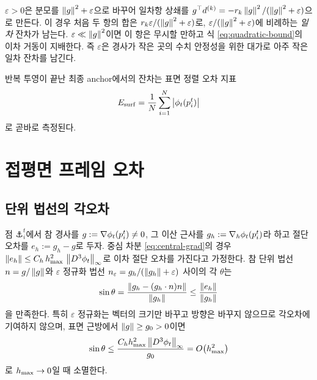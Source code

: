 \begin{remark}
$\varepsilon>0$은 분모를 $\left\lVert g \right\rVert^2+\varepsilon$으로 바꾸어 일차항 상쇄를
$g^{\top} d^{(k)} = -r_k\left\lVert g \right\rVert^2/(\left\lVert g \right\rVert^2+\varepsilon)$으로 만든다. 이 경우 처음
두 항의 합은 $r_k\varepsilon/(\left\lVert g \right\rVert^2+\varepsilon)$로,
$\varepsilon/(\left\lVert g \right\rVert^2+\varepsilon)$에 비례하는 \emph{일차} 잔차가 남는다.
$\varepsilon \ll \left\lVert g \right\rVert^2$이면 이 항은 무시할 만하고 식
\eqref{eq:quadratic-bound}의 이차 거동이 지배한다. 즉 $\varepsilon$은 경사가 작은 곳의
수치 안정성을 위한 대가로 아주 작은 일차 잔차를 남긴다.
\end{remark}

반복 투영이 끝난 최종 anchor에서의 잔차는 표면 정렬 오차 지표
\begin{equation}
  E_{\mathrm{surf}} = \frac{1}{N}\sum_{i=1}^{N}\left\lvert \phi_t(p^t_i) \right\rvert
  \label{eq:e-surf}
\end{equation}
로 곧바로 측정된다.

\section{접평면 프레임 오차}
\label{sec:frame-error}

\subsection{단위 법선의 각오차}

\begin{proposition}
\label{prop:normal-error}
점 $\anchor^t_i$에서 참 경사를 $g := \nabla\phi_t(p^t_i)\ne0$, 그 이산 근사를
$g_h := \nabla_h\phi_t(p^t_i)$라 하고 절단 오차를 $e_h := g_h - g$로 두자. 중심
차분 \eqref{eq:central-grad}의 경우
$\left\lVert e_h \right\rVert \le C_h\,h_{\max}^2\,\left\lVert D^3\phi_t \right\rVert_\infty$로 이차 절단 오차를 가진다고
가정한다. 참 단위 법선 $n = g/\left\lVert g \right\rVert$와 $\varepsilon$ 정규화 법선
$n_\varepsilon = g_h/(\left\lVert g_h \right\rVert+\varepsilon)$ 사이의 각 $\theta$는
\begin{equation}
  \sin\theta = \frac{\left\lVert g_h - (g_h\cdot n)n \right\rVert}{\left\lVert g_h \right\rVert}
  \le \frac{\left\lVert e_h \right\rVert}{\left\lVert g_h \right\rVert}
  \label{eq:sin-theta}
\end{equation}
을 만족한다. 특히 $\varepsilon$ 정규화는 벡터의 크기만 바꾸고 방향은 바꾸지 않으므로
각오차에 기여하지 않으며, 표면 근방에서 $\left\lVert g \right\rVert\ge g_0>0$이면
\begin{equation}
  \sin\theta \le \frac{C_h h_{\max}^2 \left\lVert D^3\phi_t \right\rVert_\infty}{g_0} = O\bigl(h_{\max}^2\bigr)
  \label{eq:normal-rate}
\end{equation}
로 $h_{\max}\to0$일 때 소멸한다.
\end{proposition}

